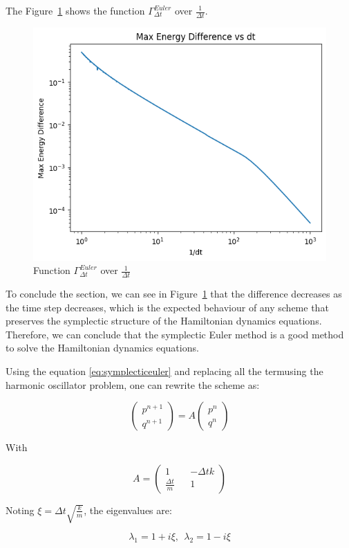 \documentclass{article}
\begin{document}
The Figure~\ref*{fig:eulermaxenergy} shows the function \(\Gamma_{\Delta t}^{Euler}\) over \(\frac{1}{\Delta t}\).

\begin{figure}[H]
	\centering
	\includegraphics[width=0.5\linewidth]{./Figures/Sympletic/eulermaxenergy.png}
	\caption{Function \(\Gamma_{\Delta t}^{Euler}\) over \(\frac{1}{\Delta t}\)}
	\label{fig:eulermaxenergy}
\end{figure}

To conclude the section, we can see in Figure~\ref*{fig:eulermaxenergy} that the difference decreases as the time step decreases, which is the expected behaviour of any scheme that preserves the symplectic structure of the Hamiltonian dynamics equations. Therefore, we can conclude that the symplectic Euler method is a good method to solve the Hamiltonian dynamics equations.

\label{sec:linear_stability_symplectic_euler}

Using the equation \ref{eq:symplecticeuler} and replacing all the termusing the harmonic oscillator problem, one can rewrite the scheme as:

\[
	\begin{pmatrix} p^{n+1} \\ q^{n+1} \end{pmatrix} = A \begin{pmatrix} p^{n} \\ q^{n} \end{pmatrix}
\]

With

\[
	A = \begin{pmatrix}
		1 && -\Delta t k \\
		\frac{\Delta t}{m} && 1
	\end{pmatrix}
\]

Noting \(\xi = \Delta t \sqrt{\frac{k}{m}}\), the eigenvalues are:

\[
	\lambda_1 = 1 + i\xi, \ \ \lambda_2 = 1 - i\xi
\]
\end{document}
